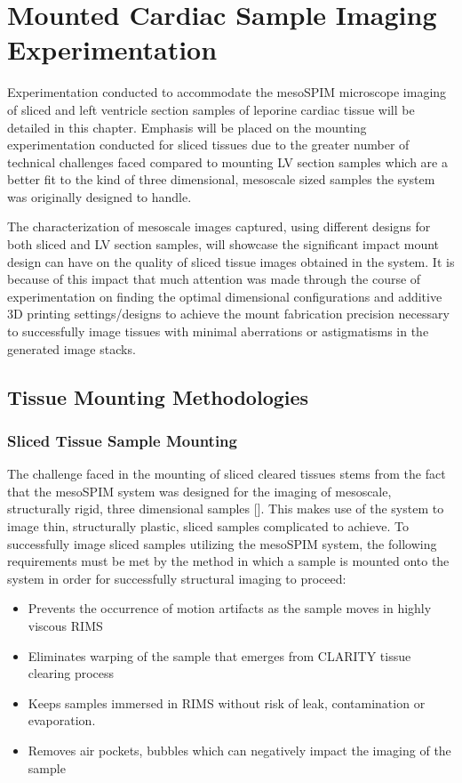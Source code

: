 \chapter{Mounted Cardiac Sample Imaging Experimentation}

Experimentation conducted to accommodate the mesoSPIM microscope imaging of sliced and left ventricle  section samples of leporine cardiac tissue will be detailed in this chapter. Emphasis will be placed on the mounting experimentation conducted for sliced tissues due to the greater number of technical challenges faced compared to mounting LV section samples which are a better fit to the kind of three dimensional, mesoscale sized samples the system was originally designed to handle.  

The characterization of mesoscale images captured, using different designs for both sliced and LV section samples, will showcase the significant impact mount design can have on the quality of sliced tissue images obtained in the system. It is because of this impact that much attention was made through the course of experimentation on finding the optimal dimensional configurations and additive 3D printing settings/designs to achieve the mount fabrication precision necessary to successfully image tissues with minimal aberrations or astigmatisms in the generated image stacks.

\section{Tissue Mounting Methodologies}
\subsection{Sliced Tissue Sample Mounting}

The challenge faced in the mounting of sliced cleared tissues stems from the fact that the mesoSPIM system was designed for the imaging of mesoscale, structurally rigid, three dimensional samples []. This makes use of the system to image thin, structurally plastic, sliced samples complicated to achieve. To successfully image sliced samples utilizing the mesoSPIM system, the following requirements must be met by the method in which a sample is mounted onto the system in order for successfully structural imaging to proceed: 

\begin{itemize}
    \item Prevents the occurrence of motion artifacts as the sample moves in highly viscous RIMS
    \item Eliminates warping of the sample that emerges from CLARITY tissue clearing process
    \item Keeps samples immersed in RIMS without risk of leak, contamination or evaporation.
    \item Removes air pockets, bubbles which can negatively impact the imaging of the sample
\end{itemize}

